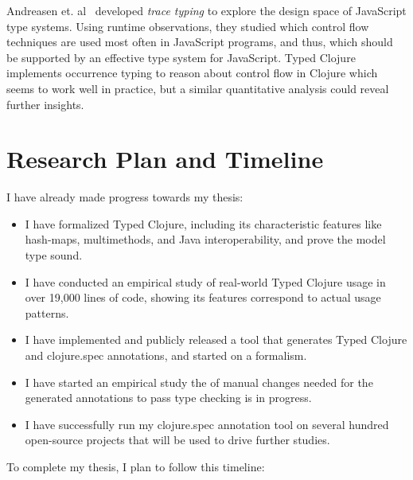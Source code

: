 \documentclass[9pt]{extarticle}
\begin{document}
Andreasen et. al~\cite{Andreasen2016TraceTA} developed
\emph{trace typing} to explore the design space of JavaScript type systems. 
Using runtime observations, they studied which control flow techniques
are used most often in JavaScript programs, and thus, which should
be supported by an effective type system for JavaScript.
Typed Clojure implements occurrence typing to reason about control
flow in Clojure which seems to work well in practice, but a similar
quantitative analysis could reveal further insights.



\section{Research Plan and Timeline}

I have already made progress towards my thesis:

\begin{itemize}
  \item I have formalized Typed Clojure, including
    its characteristic features like hash-maps, multimethods, and Java interoperability,
    and prove the model type sound.
  \item I have conducted an empirical study of real-world Typed Clojure usage
    in over 19,000 lines of code, showing its features correspond to actual usage patterns.
  \item I have implemented and publicly released a tool that generates
    Typed Clojure and clojure.spec annotations, and started on a formalism.
  \item I have started an empirical study the of manual changes needed for the generated annotations
    to pass type checking is in progress.
  \item I have successfully run my clojure.spec annotation tool on several hundred open-source projects that
    will be used to drive further studies.
\end{itemize}

To complete my thesis, I plan to follow this timeline:
\end{document}
